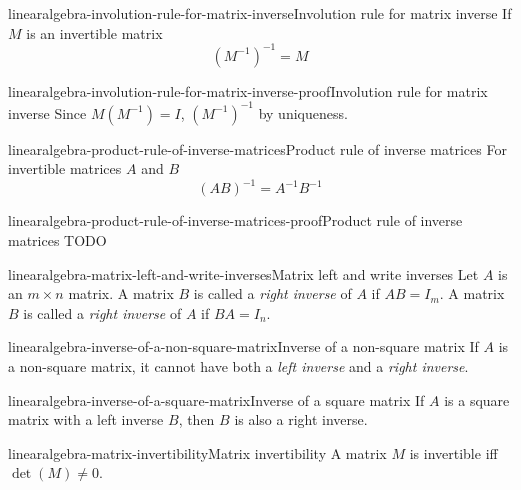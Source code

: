 \documentclass[preview]{standalone}
\begin{document}
\begin{snippetproposition}{linearalgebra-involution-rule-for-matrix-inverse}{Involution rule for matrix inverse}{
    If \(M\) is an invertible matrix
    \[
        {(M^{-1})}^{-1} = M
    \]
}
\end{snippetproposition}

\begin{snippetproof}{linearalgebra-involution-rule-for-matrix-inverse-proof}{Involution rule for matrix inverse}{
    Since \(M(M^{-1}) = I\), \({(M^{-1})}^{-1}\)
    by uniqueness. %
}
\end{snippetproof}

\begin{snippetproposition}{linearalgebra-product-rule-of-inverse-matrices}{Product rule of inverse matrices}{
    For invertible matrices \(A\) and \(B\)
    \[
        {(AB)}^{-1} = A^{-1} B^{-1}
    \]
}
\end{snippetproposition}

\begin{snippetproof}{linearalgebra-product-rule-of-inverse-matrices-proof}{Product rule of inverse matrices}{
    TODO
}
\end{snippetproof}

\begin{snippetdefinition}{linearalgebra-matrix-left-and-write-inverses}{Matrix left and write inverses}{
    Let \(A\) is an \(m \times n\) matrix. A matrix \(B\)
    is called a \textit{right inverse} of \(A\)
    if \(AB=I_m\).
    A matrix \(B\) is called a \textit{right inverse} of \(A\)
    if \(BA=I_n\).
}
\end{snippetdefinition}

\begin{snippetproposition}{linearalgebra-inverse-of-a-non-square-matrix}{Inverse of a non-square matrix}{
    If \(A\) is a non-square matrix, it cannot have
    both a \textit{left inverse} and a \textit{right inverse}.
}
\end{snippetproposition}

\begin{snippetproposition}{linearalgebra-inverse-of-a-square-matrix}{Inverse of a square matrix}{
    If \(A\) is a square matrix
    with a left inverse \(B\),
    then \(B\) is also a right inverse.
}
\end{snippetproposition}

\begin{snippetproposition}{linearalgebra-matrix-invertibility}{Matrix invertibility}{
    A matrix \(M\) is invertible iff
    \(\det(M) \neq 0\).
}
\end{snippetproposition}
\end{document}
